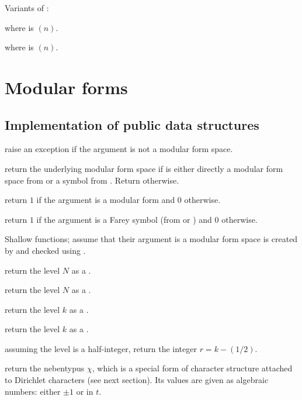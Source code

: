 Variants of  :


 where  is $(n)$.

 where  is $(n)$.

\newpage

\chapter{Modular forms}

\section{Implementation of public data structures}

 raise an exception if the argument is not a
modular form space.

 return the underlying modular form space
if  is either directly a modular form space from 
or a symbol from . Return  otherwise.

 return $1$ if the argument is a modular form
and $0$ otherwise.

 return $1$ if the argument is a Farey symbol
(from  or ) and $0$ otherwise.


Shallow functions; assume that their argument is a modular form space
is created by  and checked using .

 return the level $N$ as a .

 return the level $N$ as a .

 return the level $k$ as a .

 return the level $k$ as a .

 assuming the level is a half-integer, return
the integer $r = k - (1/2)$.

 return the nebentypus $\chi$, which is a
 special form of character structure attached to Dirichlet characters (see
 next section). Its values are given as algebraic numbers: either $\pm1$ or
  in $t$.

